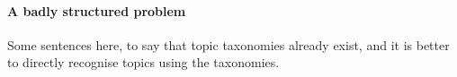 



\paragraph{\statusred A badly structured problem}

Some sentences here, to say that topic taxonomies already exist, and it is better to directly recognise topics using the taxonomies.



